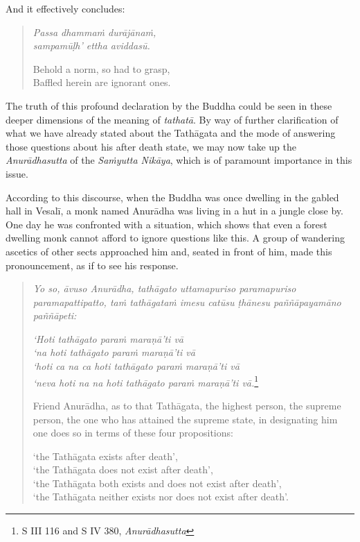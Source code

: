 And it effectively concludes:

\begin{quote}
\emph{Passa dhammaṁ durājānaṁ,}\\
\emph{sampamūḷh' ettha aviddasū.}

Behold a norm, so had to grasp,\\
Baffled herein are ignorant ones.
\end{quote}

The truth of this profound declaration by the Buddha could be seen in these deeper dimensions of the meaning of \emph{tathatā}. By way of further clarification of what we have already stated about the Tathāgata and the mode of answering those questions about his after death state, we may now take up the \emph{Anurādhasutta} of the \emph{Saṁyutta Nikāya}, which is of paramount importance in this issue.

According to this discourse, when the Buddha was once dwelling in the gabled hall in Vesalī, a monk named Anurādha was living in a hut in a jungle close by. One day he was confronted with a situation, which shows that even a forest dwelling monk cannot afford to ignore questions like this. A group of wandering ascetics of other sects approached him and, seated in front of him, made this pronouncement, as if to see his response.

\begin{quote}
\emph{Yo so, āvuso Anurādha, tathāgato uttamapuriso paramapuriso paramapattipatto, taṁ tathāgataṁ imesu catūsu ṭhānesu paññāpayamāno paññāpeti:}

\emph{`Hoti tathāgato paraṁ maraṇā'ti vā\\
`na hoti tathāgato paraṁ maraṇā'ti vā\\
`hoti ca na ca hoti tathāgato paraṁ maraṇā'ti vā\\
`neva hoti na na hoti tathāgato paraṁ maraṇā'ti vā.}\footnote{S III 116 and S IV 380, \emph{Anurādhasutta}}

Friend Anurādha, as to that Tathāgata, the highest person, the supreme person, the one who has attained the supreme state, in designating him one does so in terms of these four propositions:

`the Tathāgata exists after death',\\
`the Tathāgata does not exist after death',\\
`the Tathāgata both exists and does not exist after death',\\
`the Tathāgata neither exists nor does not exist after death'.
\end{quote}

